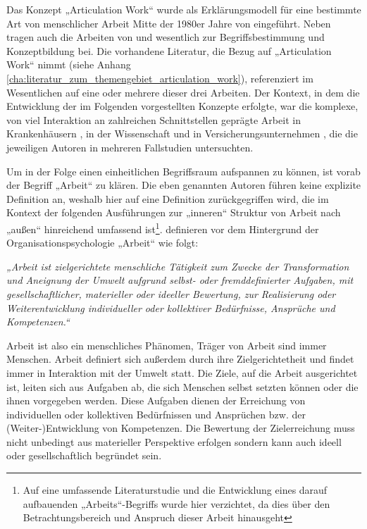 Das Konzept „Articulation Work“ wurde als Erklärungsmodell für eine bestimmte Art von menschlicher Arbeit Mitte der 1980er Jahre von \citet{Strauss85} eingeführt. Neben \citet{Strauss85} tragen auch die Arbeiten von \citet{Gerson86} und \citet{Fujimura87} wesentlich zur Begriffsbestimmung und Konzeptbildung bei. Die vorhandene Literatur, die Bezug auf „Articulation Work“ nimmt (siehe Anhang \ref{cha:literatur_zum_themengebiet_articulation_work}), referenziert im Wesentlichen auf eine oder mehrere dieser drei Arbeiten. Der Kontext, in dem die Entwicklung der im Folgenden vorgestellten Konzepte erfolgte, war die komplexe, von viel Interaktion an zahlreichen Schnittstellen geprägte Arbeit in Krankenhäusern \citep{Strauss85}, in der Wissenschaft \citep{Fujimura87} und in Versicherungsunternehmen \citep{Gerson86}, die die jeweiligen Autoren in mehreren Fallstudien untersuchten. 

Um in der Folge einen einheitlichen Begriffsraum aufspannen zu können, ist vorab der Begriff „Arbeit“ zu klären. Die eben genannten Autoren führen keine explizite Definition an, weshalb hier auf eine Definition zurückgegriffen wird, die im Kontext der folgenden Ausführungen zur „inneren“ Struktur von Arbeit nach „außen“ hinreichend umfassend ist\footnote{Auf eine umfassende Literaturstudie und die Entwicklung eines darauf aufbauenden „Arbeits“-Begriffs wurde hier verzichtet, da dies über den Betrachtungsbereich und Anspruch dieser Arbeit hinausgeht}. \citet{Semmer04} definieren vor dem Hintergrund der Organisationspsychologie „Arbeit“ wie folgt: 

\emph{„Arbeit ist zielgerichtete menschliche Tätigkeit zum Zwecke der Transformation und Aneignung der Umwelt aufgrund selbst- oder fremddefinierter Aufgaben, mit gesellschaftlicher, materieller oder ideeller Bewertung, zur Realisierung oder Weiterentwicklung individueller oder kollektiver Bedürfnisse, Ansprüche und Kompetenzen.“} 

Arbeit ist also ein menschliches Phänomen, Träger von Arbeit sind immer Menschen. Arbeit definiert sich außerdem durch ihre Zielgerichtetheit und findet immer in Interaktion mit der Umwelt statt. Die Ziele, auf die Arbeit ausgerichtet ist, leiten sich aus Aufgaben ab, die sich Menschen selbst setzten können oder die ihnen vorgegeben werden. Diese Aufgaben dienen der Erreichung von individuellen oder kollektiven Bedürfnissen und Ansprüchen bzw. der (Weiter-)Entwicklung von Kompetenzen. Die Bewertung der Zielerreichung muss nicht unbedingt aus materieller Perspektive erfolgen sondern kann auch ideell oder gesellschaftlich begründet sein. 

